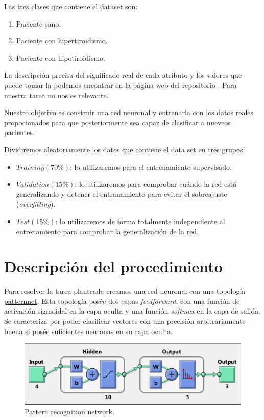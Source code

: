 \documentclass[a4paper,12pt,titlepage]{article}
\begin{document}
\newpage

Las tres clases que contiene el dataset son:

\begin{enumerate}[noitemsep]
	\item Paciente sano.
	\item Paciente con hipertiroidismo.
	\item Paciente con hipotiroidismo.
\end{enumerate}

La descripción precisa del significado real de cada atributo y los valores que puede tomar la podemos encontrar en la página web del repositorio \citep{Asuncion+Newman:2007}. Para nuestra tarea no nos es relevante.

Nuestro objetivo es construir una red neuronal y entrenarla con los datos reales propocionados para que posteriormente sea capaz de clasificar a nueveos pacientes. 

Dividiremos aleatoriamente los datos que contiene el data set en tres grupos:

\begin{itemize}[noitemsep]
	\item $Training (70\%)$: lo utilizaremos para el entrenamiento supervisado.
	\item $Validation (15\%)$: lo utilizaremos para comprobar cuándo la red está generalizando y detener el entranamiento para evitar el sobreajuste (\textit{overfitting}).
	\item $Test (15\%)$: lo utilizaremos de forma totalmente independiente al entrenamiento para comprobar la generalización de la red.
\end{itemize}

\section{Descripción del procedimiento}

Para resolver la tarea planteada creamos una red neuronal con una topología \href{http://www.mathworks.com/help/nnet/ref/patternnet.html}{patternnet}. Esta topología posée dos capas \textit{feedforward}, con una función de activación sigmoidal en la capa oculta y una función \textit{softmax} en la capa de salida. Se caracteriza por poder clasificar vectores con una precisión arbitrariamente buena si posée suficientes neuronas en su capa oculta.

\begin{figure}[!ht]
	\centering
	\label{fig:patternnet}
	\includegraphics[width=\textwidth]{patternnet.png}
	\caption{Pattern recognition network.}
\end{figure}
\end{document}
